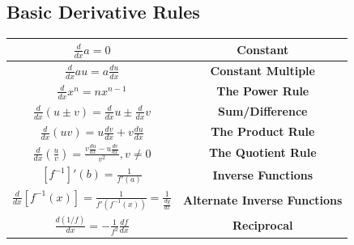 \documentclass{article}
\begin{document}
        \subsection{Basic Derivative Rules}
            \begin{center}
                \begin{tabular}{|c|c|}
                    \hline
                    $\frac{d}{dx}a = 0$ & \textbf{Constant} \\
                    \hline
                    $\frac{d}{dx}au = a\frac{du}{dx}$ & \textbf{Constant Multiple} \\
                    \hline
                    $\frac{d}{dx}x^n=nx^{n-1}$ & \color{purple} \textbf{The Power Rule} \color{black} \\
                    \hline
                    $\frac{d}{dx}(u\pm v) = \frac{d}{dx}u \pm \frac{d}{dx}v$ & \textbf{Sum/Difference}\\
                    \hline
                    $\frac{d}{dx}(uv) = u\frac{dv}{dx}+v\frac{du}{dx}$ & \color{purple}
                    \textbf{The Product Rule} \color{black} \\
                    \hline
                    $\frac{d}{dx}\left(\frac{u}{v}\right)=\frac{v\frac{du}{dx}-u\frac{dv}{dx}}{v^2},
                    v\not = 0$ & \color{purple} \textbf{The Quotient Rule} \color{black} \\
                    \hline
                    $[f^{-1}]'(b)=\frac{1}{f'(a)}$ & \textbf{Inverse Functions} \\
                    \hline
                    $\frac{d}{dx}[f^{-1}(x)]=\frac{1}{f'(f^{-1}(x))}=\frac{1}{\frac{dy}{dx}}$ &
                    \textbf{Alternate Inverse Functions} \\
                    \hline
                    $\frac{d(1/f)}{dx}=-\frac{1}{f^2}\frac{df}{dx}$ & \textbf{Reciprocal} \\
                    \hline
                \end{tabular}
            \end{center}
\end{document}
